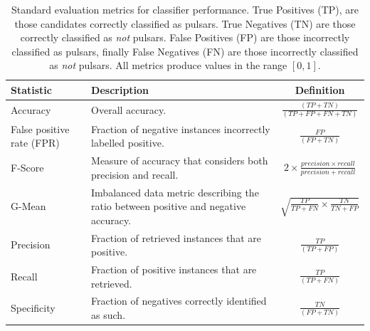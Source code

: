 \documentclass[twoside,a4paper]{refart}
\begin{document}
\begin{table}
\small
\centering
\begin{tabular}{|m{1.2cm}|m{3cm}|c|}
\hline
{\bf Statistic} & {\bf Description} & {\bf Definition} \\ 
\hline\hline	
Accuracy & Overall accuracy. & $\frac{(TP+TN)}{(TP+FP+FN+TN)}$ \\
\hline
False positive rate (FPR) & Fraction of negative instances incorrectly labelled positive. & $\frac{FP}{(FP +TN)}$\\
\hline
F-Score & Measure of accuracy that considers both precision and recall. & $2\times{ \frac{precision\times{recall}} {precision + recall}} $\\
\hline
G-Mean & Imbalanced data metric describing the ratio between positive and negative accuracy. & $\sqrt{\frac{TP}{TP+FN}\times \frac{TN}{TN+FP}}$\\
\hline	
Precision & Fraction of retrieved instances that are positive. & $\frac{TP}{(TP+FP)}$ \\
\hline
Recall & Fraction of positive instances that are retrieved. & $\frac{TP}{(TP + FN)}$\\
\hline	
Specificity & Fraction of negatives correctly identified as such. & $ \frac{TN}{(FP + TN)}$ \\
\hline
\end{tabular}
\caption[Standard evaluation metrics for classifier performance.]{Standard evaluation metrics for classifier performance. True Positives (TP), are those candidates correctly classified as pulsars. True Negatives (TN) are those correctly classified as \textit{not} pulsars. False Positives (FP) are those incorrectly classified as pulsars, finally False Negatives (FN) are those incorrectly classified as \textit{not} pulsars. All metrics produce values in the range $[0,1]$. }
 \label{tab:metrics}
 \vspace{-1.0em}
\end{table}

\newpage



\printindex
\end{document}
